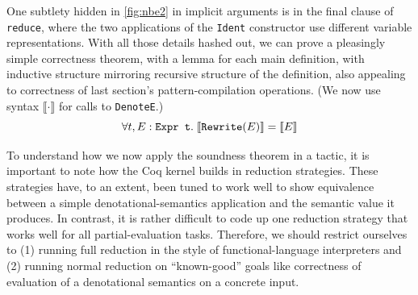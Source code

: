 \documentclass[sn-mathphys,pdflatex]{sn-jnl}%
\newcommand{\textmintinline}[2]{\text{\texttt{#2}}}
\newcommand{\citetfield}[1]{\usebibentry{#1}{citet}~\cite{#1}}
\theoremstyle{thmstyleone}%
\theoremstyle{thmstyletwo}%
\theoremstyle{thmstylethree}%
\begin{document}
One subtlety hidden in \autoref{fig:nbe2} in implicit arguments is in the final clause of \texttt{reduce}, where the two applications of the \texttt{Ident} constructor use different variable representations.
With all those details hashed out, we can prove a pleasingly simple correctness theorem, with a lemma for each main definition, with inductive structure mirroring recursive structure of the definition, also appealing to correctness of last section's pattern-compilation operations.
(We now use syntax $\llbracket \cdot \rrbracket$ for calls to \texttt{DenoteE}.)
$$\forall t, E : \textmintinline{coq}{Expr t}. \; \llbracket \textmintinline{coq}{Rewrite}(E) \rrbracket = \llbracket E \rrbracket$$


To understand how we now apply the soundness theorem in a tactic, it is important to note how the Coq kernel builds in reduction strategies.
These strategies have, to an extent, been tuned to work well to show equivalence between a simple denotational-semantics application and the semantic value it produces.
In contrast, it is rather difficult to code up one reduction strategy that works well for all partial-evaluation tasks.
Therefore, we should restrict ourselves to (1) running full reduction in the style of functional-language interpreters and (2) running normal reduction on ``known-good'' goals like correctness of evaluation of a denotational semantics on a concrete input.
\end{document}
